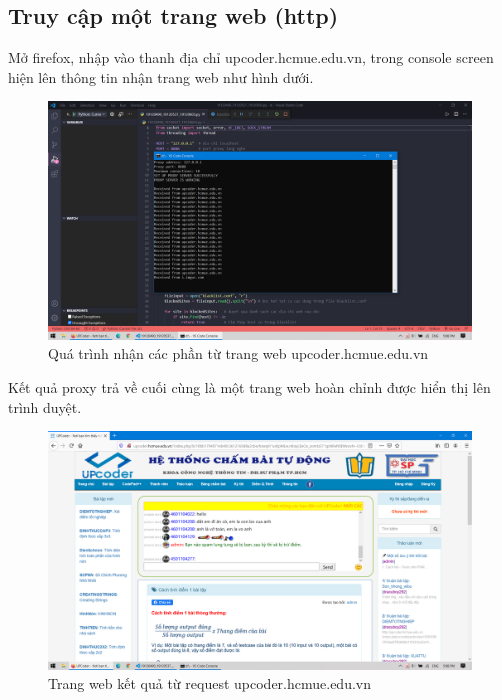 \documentclass[12pt,a4paper]{article}
\begin{document}
		\subsection{Truy cập một trang web (http)}
			Mở firefox, nhập vào thanh địa chỉ upcoder.hcmue.edu.vn, trong console screen hiện lên thông tin nhận trang web như hình dưới.
			\begin{center}
				\begin{figure}[H]
					\begin{center}
						\includegraphics[scale=.25]{images/run_receiving}
					\end{center}
					\caption{Quá trình nhận các phần từ trang web upcoder.hcmue.edu.vn}
				\end{figure}
			\end{center}
			Kết quả proxy trả về cuối cùng là một trang web hoàn chỉnh được hiển thị lên trình duyệt.
			\begin{center}
				\begin{figure}[H]
					\begin{center}
						\includegraphics[scale=.25]{images/run_result}
					\end{center}
					\caption{Trang web kết quả từ request upcoder.hcmue.edu.vn}
				\end{figure}
			\end{center}
\end{document}
